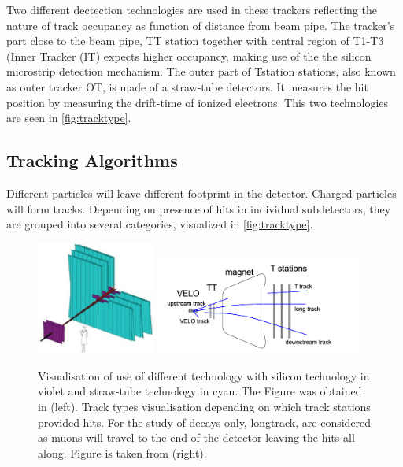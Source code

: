  Two different dectection technologies are used in these trackers reflecting the nature of track occupancy as function of distance from beam pipe. The tracker's part close to the beam pipe, \Gls{TT} station together with central region of T1-T3 (Inner Tracker (\Gls{IT}) expects higher occupancy, making use of the the silicon microstrip detection mechanism. The outer part of \Gls{Tstation} stations, also known as outer tracker \Gls{OT}, is made of a straw-tube detectors. It measures the hit position by measuring the drift-time of ionized electrons. This two technologies are seen in \autoref{fig:tracktype}. 

\subsection{Tracking Algorithms}
Different particles will leave different footprint in the detector. Charged particles will form tracks. Depending on presence of hits in individual subdetectors, they are grouped into several categories, visualized in \autoref{fig:tracktype}.

\begin{figure}[!h]
	\centering
	\includegraphics[width = 0.35\textwidth]{figs/detector/trackingsystem.jpg}%
	\includegraphics[width = 0.6\textwidth]{figs/detector/tracktype.png}
	\caption{ Visualisation of use of different technology with silicon technology in violet and straw-tube technology in cyan. The Figure was obtained in \cite{OT}(left). Track types visualisation depending on which track stations provided hits. For the study of \Bmumumu decays only, \Gls{longtrack}, are considered as muons will travel to the end of the detector leaving the hits all along. Figure is taken from \cite{LHCb-DP-2013-002} (right).}
	\label{fig:tracktype}
\end{figure}

